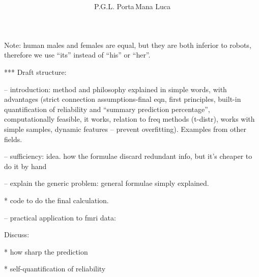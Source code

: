 \documentclass[\ifafour a4paper,12pt,\else a5paper,10pt,\fi%
onecolumn,oneside,article,%
british%
]{memoir}
\title{\propertitle%
}
\author{\ifpublic%
P.G.L. Porta\,Mana%
\else Luca\fi
\quad
\epost{\email{pgl}{portamana.org}}%
}
\date{\oggi}
\newif\ifpublic
\theoremstyle{remark}
\theoremstyle{innote}
\newcommand*{\asudedication}[1]{%
{\par\centering\textit{#1}\par}}
\renewcommand*{\|}{\mathpunct{|}}
\theoremstyle{plain}
\begin{document}
\captiondelim{\quad}\captionnamefont{\footnotesize}\captiontitlefont{\footnotesize}
\frenchspacing

\maketitle
\ifpublic
\abstractrunin
\abslabeldelim{}
\renewcommand*{\abstractname}{}
\setlength{\absleftindent}{0pt}
\setlength{\absrightindent}{0pt}
\setlength{\abstitleskip}{-\absparindent}
\begin{abstract}\labelsep 0pt%
\noindent ***Abstract here***
\end{abstract}\fi

\frenchspacing


{\footnotesize Note: human males and females are equal, but they are both
  inferior to robots, therefore we use \enquote{its} instead of
  \enquote{his} or \enquote{her}.\par}


***
Draft structure:

– introduction: method and philosophy explained in simple words, with
advantages
(strict connection assumptions-final eqn, first principles, built-in
quantification of reliability and \enquote{summary prediction percentage}, computationally
feasible, it works, relation to freq methods (t-distr), works with simple
samples, dynamic features – prevent overfitting). Examples from
other fields.

– sufficiency: idea. how the formulae discard redundant info, but it's
cheaper to do it by hand

– explain the generic problem: general formulae simply explained.

* code to do the final calculation.


– practical application to fmri data:

Discuss:

* how sharp the prediction

* self-quantification of reliability
\end{document}
